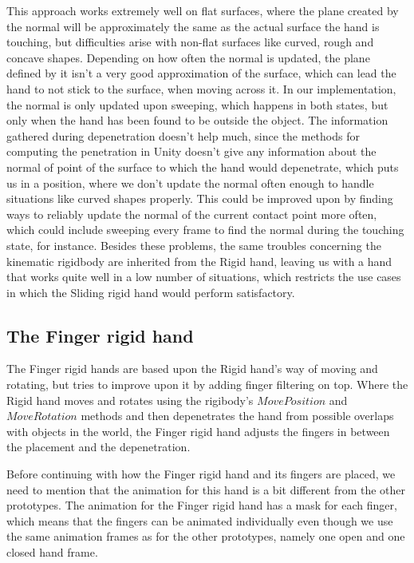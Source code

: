 This approach works extremely well on flat surfaces, where the plane created by the normal will be approximately the same as the actual surface the hand is touching, but difficulties arise with non-flat surfaces like curved, rough and concave shapes. Depending on how often the normal is updated, the plane defined by it isn't a very good approximation of the surface, which can lead the hand to not stick to the surface, when moving across it. In our implementation, the normal is only updated upon sweeping, which happens in both states, but only when the hand has been found to be outside the object. The information gathered during depenetration doesn't help much, since the methods for computing the penetration in Unity doesn't give any information about the normal of point of the surface to which the hand would depenetrate, which puts us in a position, where we don't update the normal often enough to handle situations like curved shapes properly. This could be improved upon by finding ways to reliably update the normal of the current contact point more often, which could include sweeping every frame to find the normal during the touching state, for instance. Besides these problems, the same troubles concerning the kinematic rigidbody are inherited from the Rigid hand, leaving us with a hand that works quite well in a low number of situations, which restricts the use cases in which the Sliding rigid hand would perform satisfactory.

\subsection{The Finger rigid hand}
\label{subsec:fingerRigidHand}
The Finger rigid hands are based upon the Rigid hand's way of moving and rotating, but tries to improve upon it by adding finger filtering on top. Where the Rigid hand moves and rotates using the rigibody's $MovePosition$ and $MoveRotation$ methods and then depenetrates the hand from possible overlaps with objects in the world, the Finger rigid hand adjusts the fingers in between the placement and the depenetration.

Before continuing with how the Finger rigid hand and its fingers are placed, we need to mention that the animation for this hand is a bit different from the other prototypes. The animation for the Finger rigid hand has a mask for each finger, which means that the fingers can be animated individually even though we use the same animation frames as for the other prototypes, namely one open and one closed hand frame.

